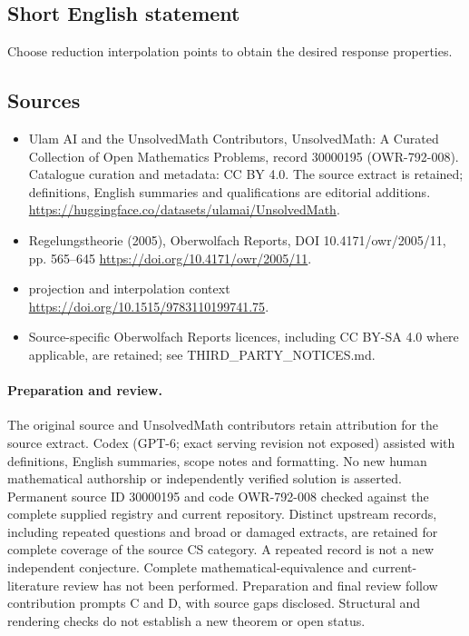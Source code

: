 \documentclass[11pt]{article}
\begin{document}
\subsection{Short English statement}
Choose reduction interpolation points to obtain the desired response properties.
\subsection{Sources}
\begin{itemize}
\item[\hypertarget{source:30000195:1}{S1}] Ulam AI and the UnsolvedMath Contributors, UnsolvedMath: A Curated Collection of Open Mathematics Problems, record 30000195 (OWR-792-008). Catalogue curation and metadata: CC BY 4.0. The source extract is retained; definitions, English summaries and qualifications are editorial additions.
\url{https://huggingface.co/datasets/ulamai/UnsolvedMath}.
\item[\hypertarget{source:30000195:2}{S2}] Regelungstheorie (2005), Oberwolfach Reports, DOI 10.4171/owr/2005/11, pp. 565--645
\url{https://doi.org/10.4171/owr/2005/11}.
\item[\hypertarget{source:30000195:3}{S3}] projection and interpolation context
\url{https://doi.org/10.1515/9783110199741.75}.
\item Source-specific Oberwolfach Reports licences, including CC BY-SA 4.0 where applicable, are retained; see THIRD\_PARTY\_NOTICES.md.
\end{itemize}
\paragraph{Preparation and review.}
The original source and UnsolvedMath contributors retain attribution for the source extract. Codex (GPT-6; exact serving revision not exposed) assisted with definitions, English summaries, scope notes and formatting. No new human mathematical authorship or independently verified solution is asserted. Permanent source ID 30000195 and code OWR-792-008 checked against the complete supplied registry and current repository. Distinct upstream records, including repeated questions and broad or damaged extracts, are retained for complete coverage of the source CS category. A repeated record is not a new independent conjecture. Complete mathematical-equivalence and current-literature review has not been performed. Preparation and final review follow contribution prompts C and D, with source gaps disclosed. Structural and rendering checks do not establish a new theorem or open status.
\label{end:30000195}
\end{document}
